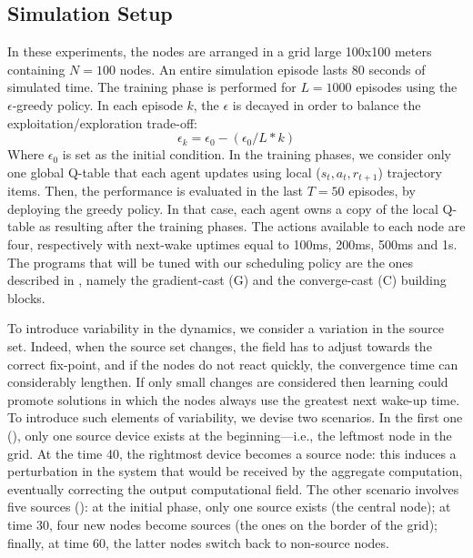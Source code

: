 \subsection{Simulation Setup}\label{acsos2022:s:simulation-setup}
In these experiments, the nodes are arranged in a grid large 100x100 meters containing $N=100$ nodes. 
 An entire simulation episode lasts 80 seconds of simulated time.
 The training phase is performed for $L=1000$ episodes using the $\epsilon$-greedy policy.
 In each episode $k$, the $\epsilon$ is decayed in order to balance the exploitation/exploration trade-off:
\begin{equation}
\epsilon_k = \epsilon_0 - (\epsilon_0 / L * k)
\end{equation}
Where $\epsilon_0$ is set as the initial condition.
In the training phases, we consider only one global Q-table that each agent updates 
 using local ($s_t, a_t, r_{t+1}$) trajectory items.
Then, the performance is evaluated in the last $T=50$ episodes, by deploying the greedy policy.
In that case, each agent owns a copy of the local Q-table as resulting after the training phases.
 The actions available to each node are four, respectively with next-wake uptimes equal to 100ms, 200ms, 500ms and 1s.
 The programs that will be tuned with our scheduling policy are the ones described in ,
  namely the gradient-cast (G) and the converge-cast (C) building blocks.

To introduce variability in the dynamics, we consider a variation in the source set. 
%
Indeed, 
 when the source set changes, 
 the field has to adjust towards the correct fix-point, 
 and if the nodes do not react quickly, 
 the convergence time can considerably lengthen.
%
If only small changes are considered 
 then learning could promote solutions in which the nodes always 
 use the greatest next wake-up time. %
%
To introduce such elements of variability, 
 we devise two scenarios. 
 In the first one (\swapscen{}), 
 only one source device exists at the beginning---i.e., the leftmost node in the grid. 
%
At the time 40, 
 the rightmost device becomes a source node:
 this induces a perturbation in the system
 that would 
 be received by the aggregate computation,
 eventually correcting the output computational field.
%
The other scenario involves five sources (\multiswap{}):
 at the initial phase, only one source exists (the central node);
 at time 30, four new nodes become sources (the ones on the border of the grid); finally, 
 at time 60, the latter nodes switch back to non-source nodes.

